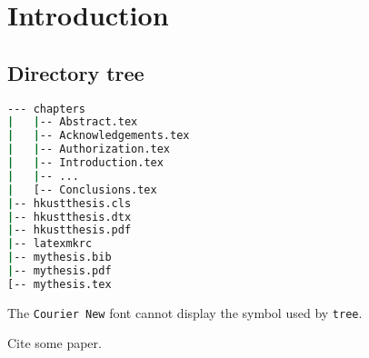 \chapter{Introduction}

\section{Directory tree}
\label{sec:directory}

\begin{lstlisting}[language=bash]
--- chapters
|   |-- Abstract.tex
|   |-- Acknowledgements.tex
|   |-- Authorization.tex
|   |-- Introduction.tex
|   |-- ...
|   [-- Conclusions.tex
|-- hkustthesis.cls
|-- hkustthesis.dtx
|-- hkustthesis.pdf
|-- latexmkrc
|-- mythesis.bib
|-- mythesis.pdf
[-- mythesis.tex
\end{lstlisting}

The \lstinline|Courier New| font cannot display the symbol used by \lstinline|tree|.

Cite some paper\cite{test}.
